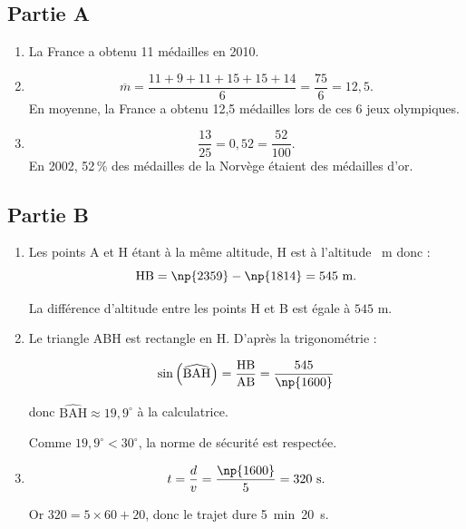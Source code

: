 \subsection*{Partie A}

\begin{enumerate}
	\item La France a obtenu 11 médailles en 2010.

	\item
	\[\overline{m}=\dfrac{11+9+11+15+15+14}{6}=\dfrac{75}{6}=12,5.\]
	En moyenne, la France a obtenu 12,5 médailles lors de ces 6 jeux olympiques.

	\item
	\[\dfrac{13}{25}=0,52=\dfrac{52}{100}.\]
	En 2002, 52\,\% des médailles de la Norvège étaient des médailles d'or.
\end{enumerate}

\subsection*{Partie B}

\begin{enumerate}
	\item Les points A et H étant à la même altitude, H est à l'altitude ~m donc :
	\[\text{HB}=\np{2359}-\np{1814}=545~\text{m}.\]

La différence d'altitude entre les points H et B est égale à $545$ m.

	\item Le triangle ABH est rectangle en H. D'après la trigonométrie :
	
\[\sin\left(\widehat{\text{BAH}}\right)=\dfrac{\text{HB}}{\text{AB}}=\dfrac{545}{\np{1600}}\]

donc $\widehat{\text{BAH}}\approx 19,9^{\circ}$ à la calculatrice.

Comme $19,9^{\circ}<30^{\circ}$, la norme de sécurité est respectée.

	\item

\[t=\dfrac{d}{v}=\dfrac{\np{1600}}{5}=320~\text{s}.\]

Or $320=5\times 60 + 20$, donc le trajet dure 5~min~20~s.
\end{enumerate}
